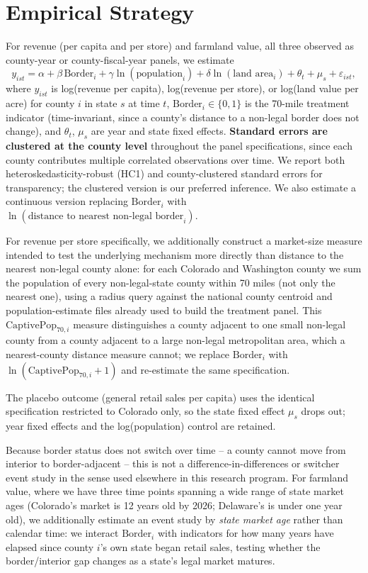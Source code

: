 ﻿\documentclass{article}
\begin{document}
\section{Empirical Strategy}
\label{sec:methods}

For revenue (per capita and per store) and farmland value, all three observed as county-year or
county-fiscal-year panels, we estimate
\[
y_{ist} = \alpha + \beta \, \text{Border}_{i} + \gamma \ln(\text{population}_{i}) + \delta \ln(\text{land area}_i)
+ \theta_t + \mu_s + \varepsilon_{ist},
\]
where $y_{ist}$ is log(revenue per capita), log(revenue per store), or log(land value per acre) for county
$i$ in state $s$ at time $t$, $\text{Border}_i \in \{0,1\}$ is the 70-mile treatment indicator (time-invariant, since a county's
distance to a non-legal border does not change), and $\theta_t$, $\mu_s$ are year and state fixed effects.
\textbf{Standard errors are clustered at the county level} throughout the panel specifications, since each
county contributes multiple correlated observations over time. We report both heteroskedasticity-robust
(HC1) and county-clustered standard errors for transparency; the clustered version is our preferred
inference. We also estimate a continuous version replacing $\text{Border}_i$ with $\ln(\text{distance to
nearest non-legal border}_i)$.

For revenue per store specifically, we additionally construct a market-size measure intended to test the
underlying mechanism more directly than distance to the nearest non-legal county alone: for each Colorado
and Washington county we sum the population of every non-legal-state county within 70 miles (not only the
nearest one), using a radius query against the national county centroid and population-estimate files
already used to build the treatment panel. This $\text{CaptivePop}_{70,i}$ measure distinguishes a county
adjacent to one small non-legal county from a county adjacent to a large non-legal metropolitan area, which
a nearest-county distance measure cannot; we replace $\text{Border}_i$ with $\ln(\text{CaptivePop}_{70,i}+1)$
and re-estimate the same specification.

The placebo outcome (general retail sales per capita) uses the identical specification restricted to
Colorado only, so the state fixed effect $\mu_s$ drops out; year fixed effects and the log(population)
control are retained.

Because border status does not switch over time -- a county cannot move from interior to border-adjacent --
this is not a difference-in-differences or switcher event study in the sense used elsewhere in this
research program. For farmland value, where we have three time points spanning a wide range of state
market ages (Colorado's market is 12 years old by 2026; Delaware's is under one year old), we
additionally estimate an event study by \emph{state market age} rather than calendar time: we interact
$\text{Border}_i$ with indicators for how many years have elapsed since county $i$'s own state began
retail sales, testing whether the border/interior gap changes as a state's legal market matures.
\end{document}
